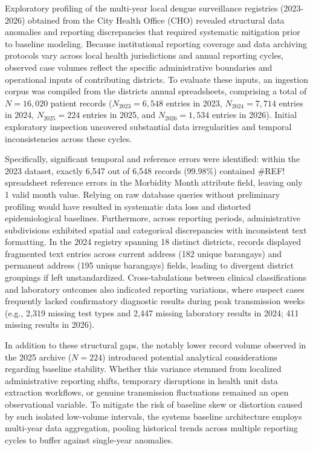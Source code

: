 \documentclass[
]{article}
\begin{document}
Exploratory profiling of the multi-year local dengue surveillance
registries (2023-2026) obtained from the City Health Office (CHO)
revealed structural data anomalies and reporting discrepancies that
required systematic mitigation prior to baseline modeling. Because
institutional reporting coverage and data archiving protocols vary
across local health jurisdictions and annual reporting cycles, observed
case volumes reflect the specific administrative boundaries and
operational inputs of contributing districts. To evaluate these inputs,
an ingestion corpus was compiled from the district\textquotesingle s
annual spreadsheets, comprising a total of \(N = 16,020\) patient
records (\(N_{2023} = 6,548\) entries in 2023, \(N_{2024} = 7,714\)
entries in 2024, \(N_{2025} = 224\) entries in 2025, and
\(N_{2026} = 1,534\) entries in 2026). Initial exploratory inspection
uncovered substantial data irregularities and temporal inconsistencies
across these cycles.


Specifically, significant temporal and reference errors were identified:
within the 2023 dataset, exactly 6,547 out of 6,548 records (99.98\%)
contained \#REF! spreadsheet reference errors in the Morbidity Month
attribute field, leaving only 1 valid month value. Relying on raw
database queries without preliminary profiling would have resulted in
systematic data loss and distorted epidemiological baselines.
Furthermore, across reporting periods, administrative subdivisions
exhibited spatial and categorical discrepancies with inconsistent text
formatting. In the 2024 registry spanning 18 distinct districts, records
displayed fragmented text entries across current address (182 unique
barangays) and permanent address (195 unique barangays) fields, leading
to divergent district groupings if left unstandardized.
Cross-tabulations between clinical classifications and laboratory
outcomes also indicated reporting variations, where suspect cases
frequently lacked confirmatory diagnostic results during peak
transmission weeks (e.g., 2,319 missing test types and 2,447 missing
laboratory results in 2024; 411 missing results in 2026).

In addition to these structural gaps, the notably lower record volume
observed in the 2025 archive (\(N = 224\)) introduced potential
analytical considerations regarding baseline stability. Whether this
variance stemmed from localized administrative reporting shifts,
temporary disruptions in health unit data extraction workflows, or
genuine transmission fluctuations remained an open observational
variable. To mitigate the risk of baseline skew or distortion caused by
such isolated low-volume intervals, the system\textquotesingle s
baseline architecture employs multi-year data aggregation, pooling
historical trends across multiple reporting cycles to buffer against
single-year anomalies.
\end{document}
